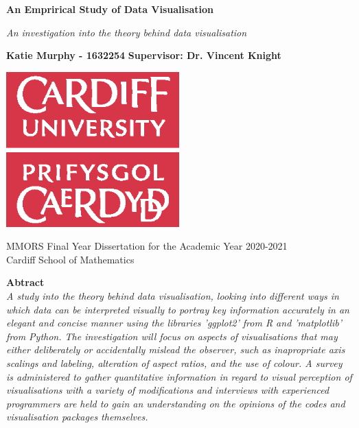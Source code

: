 \documentclass[
  11pt,
]{book}
\author{}
\date{\vspace{-2.5em}}
\begin{document}
\frontmatter

\mainmatter
\begin{titlepage}
    \begin{center}
        \vspace*{2cm}

        \textbf{An Emprirical Study of Data Visualisation}

        \vspace{0.5cm}
        \textit{An investigation into the theory behind data visualisation}

        \vspace{1.5cm}

        \textbf{Katie Murphy - 1632254}
        \textbf{Supervisor: Dr. Vincent Knight}
        \vspace{1.5cm}

        \includegraphics[width=0.5\textwidth]{universitylogo.eps}

        \vfill


        MMORS Final Year Dissertation for the Academic Year 2020-2021\\

        \vspace{0.5cm}
        Cardiff School of Mathematics

        \vspace{1.5cm}
        
        \textbf{Abtract}\\
        
        \textit{A study into the theory behind data visualisation, looking into different ways in which data can be
        interpreted visually to portray key information accurately in an elegant and concise manner using the
        libraries 'ggplot2' from R and 'matplotlib' from Python. The investigation will focus on aspects of
        visualisations that may either deliberately or accidentally mislead the observer, such as inapropriate axis 
        scalings and labeling, alteration of aspect ratios, and the use of colour. A survey is administered to gather
        quantitative information in regard to visual perception of visualisations with a variety of modifications and interviews with experienced programmers are held to gain an understanding on the
        opinions of the codes and visualisation packages themselves.}

    \end{center}
    

\end{titlepage}
\end{document}
